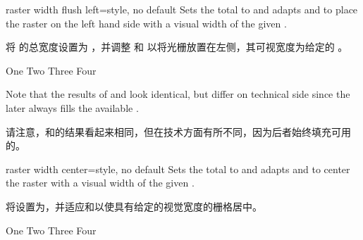 \begin{docTcbKey}[][doc new=2018-11-30]{raster width flush left}{=}{style, no default}
Sets the total  to  and adapts
 and  to
place the raster on the left hand side
with a visual width of the given .

将  的总宽度设置为 ，并调整  和  以将光栅放置在左侧，其可视宽度为给定的 。
\begin{dispExample}
\begin{tcbitemize}[raster width flush left=\linewidth/2,
size=small,colframe=red!50!black,colback=red!10!white]
\tcbitem One
\tcbitem Two
\tcbitem Three
\tcbitem Four
\end{tcbitemize}
\end{dispExample}
Note that the results of  and 
look identical, but differ on technical side since the later always fills
the available .

请注意，和的结果看起来相同，但在技术方面有所不同，因为后者始终填充可用的。
\end{docTcbKey}


\begin{docTcbKey}[][doc new=2018-11-30]{raster width center}{=}{style, no default}
Sets the total  to  and adapts
 and  to center
the raster with a visual width of the given .

将设置为，并适应和以使具有给定的视觉宽度的栅格居中。
\begin{dispExample}
\begin{tcbitemize}[raster width center=\linewidth/2,
size=small,colframe=red!50!black,colback=red!10!white]
\tcbitem One
\tcbitem Two
\tcbitem Three
\tcbitem Four
\end{tcbitemize}
\end{dispExample}
\end{docTcbKey}


